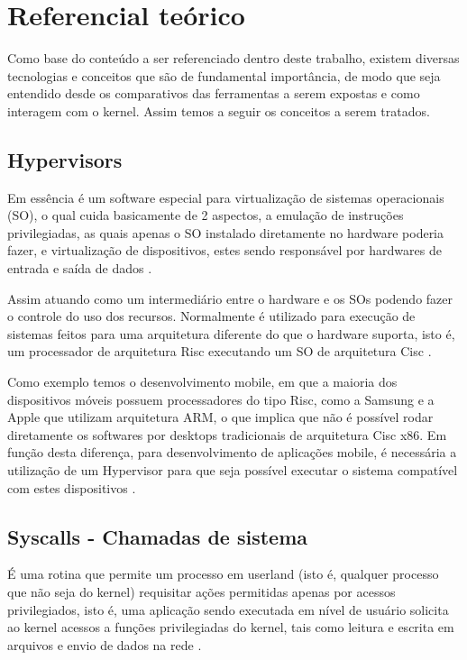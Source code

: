 \chapter{Referencial teórico}
\label{chp:referencial_teorico}

Como base do conteúdo a ser referenciado dentro deste trabalho, existem diversas tecnologias e conceitos que são de fundamental importância, de modo que seja entendido desde os comparativos das ferramentas a serem expostas e como interagem com o kernel. Assim temos a seguir os conceitos a serem tratados.


\section{Hypervisors}
Em essência é um software especial para virtualização de sistemas operacionais (SO), o qual cuida basicamente de 2 aspectos, a emulação de instruções privilegiadas, as quais apenas o SO instalado diretamente no hardware poderia fazer, e virtualização de dispositivos, estes sendo responsável por hardwares de entrada e saída de dados \cite{kernelscheepers}.

Assim atuando como um intermediário entre o hardware e os SOs podendo fazer o controle do uso dos recursos. Normalmente é utilizado para execução de sistemas feitos para uma arquitetura diferente do que o hardware suporta, isto é, um processador de arquitetura Risc executando um SO de arquitetura Cisc \cite{brief_history_qualcomm, what_are_qualcomm}.

Como exemplo temos o desenvolvimento mobile, em que a maioria dos dispositivos móveis possuem processadores do tipo Risc, como a Samsung e a Apple que utilizam arquitetura ARM, o que implica que não é possível rodar diretamente os softwares por desktops tradicionais de arquitetura Cisc x86. Em função desta diferença, para desenvolvimento de aplicações mobile, é necessária a utilização de um Hypervisor para que seja possível executar o sistema compatível com estes dispositivos \cite{best_mobile_processors_2022, apple_processor_spec, brief_history_qualcomm, what_are_qualcomm}.

\section{Syscalls - Chamadas de sistema}
\label{chp:referencial_teorico::sct:syscall}
É uma rotina que permite um processo em userland (isto é, qualquer processo que não seja do kernel) requisitar ações permitidas apenas por acessos privilegiados, isto é, uma aplicação sendo executada em nível de usuário solicita ao kernel acessos a funções privilegiadas do kernel, tais como leitura e escrita em arquivos e envio de dados na rede \cite{syscall-ibm, syscall-kerrisk}.

